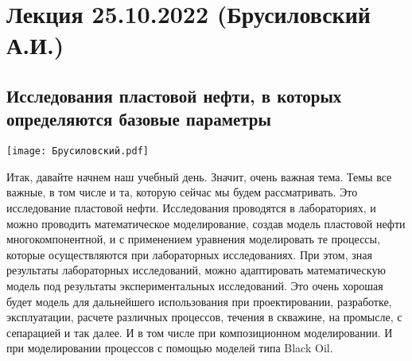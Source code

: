 \documentclass[main.tex]{subfiles}
\begin{document}
\section{Лекция 25.10.2022 (Брусиловский А.И.)}

\subsection{Исследования пластовой нефти, в которых определяются базовые параметры}

\begin{center}
\texttt{[image: Брусиловский.pdf]}
\end{center}

Итак, давайте начнем наш учебный день.
Значит, очень важная тема.
Темы все важные, в том числе и та, которую сейчас мы будем рассматривать.
Это исследование пластовой нефти.
Исследования проводятся в лабораториях, и можно проводить математическое моделирование, создав модель пластовой нефти многокомпонентной, и с
применением уравнения моделировать те процессы, которые осуществляются при лабораторных исследованиях.
При этом, зная результаты лабораторных исследований, можно адаптировать математическую модель под результаты экспериментальных исследований.
Это очень хорошая будет модель для дальнейшего использования при проектировании, разработке, эксплуатации, расчете различных процессов, течения в скважине, на промысле, с сепарацией и так далее.
И в том числе при композиционном моделировании.
И при моделировании процессов с помощью моделей типа Black Oil.
\end{document}
